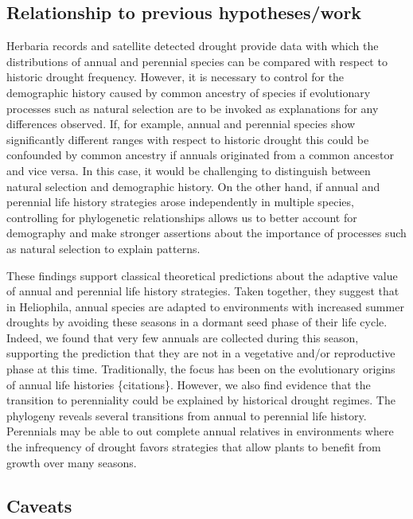 \documentclass[man,floatsintext]{apa6}
\theoremstyle{definition}
\theoremstyle{definition}
\theoremstyle{definition}
\theoremstyle{remark}
\begin{document}
\hypertarget{relationship-to-previous-hypotheseswork}{%
\subsection{Relationship to previous
hypotheses/work}\label{relationship-to-previous-hypotheseswork}}

Herbaria records and satellite detected drought provide data with which
the distributions of annual and perennial species can be compared with
respect to historic drought frequency. However, it is necessary to
control for the demographic history caused by common ancestry of species
if evolutionary processes such as natural selection are to be invoked as
explanations for any differences observed. If, for example, annual and
perennial species show significantly different ranges with respect to
historic drought this could be confounded by common ancestry if annuals
originated from a common ancestor and vice versa. In this case, it would
be challenging to distinguish between natural selection and demographic
history. On the other hand, if annual and perennial life history
strategies arose independently in multiple species, controlling for
phylogenetic relationships allows us to better account for demography
and make stronger assertions about the importance of processes such as
natural selection to explain patterns.

These findings support classical theoretical predictions about the
adaptive value of annual and perennial life history strategies. Taken
together, they suggest that in Heliophila, annual species are adapted to
environments with increased summer droughts by avoiding these seasons in
a dormant seed phase of their life cycle. Indeed, we found that very few
annuals are collected during this season, supporting the prediction that
they are not in a vegetative and/or reproductive phase at this time.
Traditionally, the focus has been on the evolutionary origins of annual
life histories \{citations\}. However, we also find evidence that the
transition to perenniality could be explained by historical drought
regimes. The phylogeny reveals several transitions from annual to
perennial life history. Perennials may be able to out complete annual
relatives in environments where the infrequency of drought favors
strategies that allow plants to benefit from growth over many seasons.

\hypertarget{caveats}{%
\subsection{Caveats}\label{caveats}}
\end{document}
